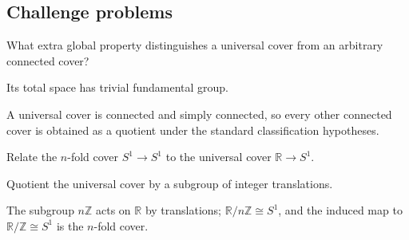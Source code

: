 \subsection*{Challenge problems}

\begin{exercise}\label{exr:viii10-ped-15}
What extra global property distinguishes a universal cover from an arbitrary connected cover?
\end{exercise}
\begin{hint}
Its total space has trivial fundamental group.
\end{hint}
\begin{solution}
A universal cover is connected and simply connected, so every other connected cover is obtained as a quotient under the standard classification hypotheses.
\end{solution}

\begin{exercise}\label{exr:viii10-ped-16}
Relate the $n$-fold cover $S^1\to S^1$ to the universal cover $\mathbb R\to S^1$.
\end{exercise}
\begin{hint}
Quotient the universal cover by a subgroup of integer translations.
\end{hint}
\begin{solution}
The subgroup $n\mathbb Z$ acts on $\mathbb R$ by translations; $\mathbb R/n\mathbb Z\cong S^1$, and the induced map to $\mathbb R/\mathbb Z\cong S^1$ is the $n$-fold cover.
\end{solution}

